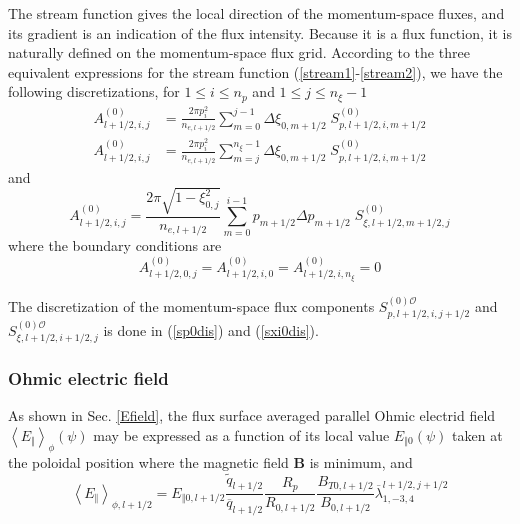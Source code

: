 \bigskip The stream function gives the local direction of the momentum-space
fluxes, and its gradient is an indication of the flux intensity. Because it is
a flux function, it is naturally defined on the momentum-space flux grid.
According to the three equivalent expressions for the stream function
(\ref{stream1}-\ref{stream2}), we have the following discretizations, for
$1\leq i\leq n_{p}$ and $1\leq j\leq n_{\xi}-1$
\begin{align}
A_{l+1/2,i,j}^{\left(  0\right)  }  &  =\frac{2\pi p_{i}^{2}}{n_{e,l+1/2}}%
\sum_{m=0}^{j-1}\Delta\xi_{0,m+1/2}\;S_{p,l+1/2,i,m+1/2}^{\left(  0\right)
}\label{streamdis}\\
A_{l+1/2,i,j}^{\left(  0\right)  }  &  =\frac{2\pi p_{i}^{2}}{n_{e,l+1/2}}%
\sum_{m=j}^{n_{\xi}-1}\Delta\xi_{0,m+1/2}\;S_{p,l+1/2,i,m+1/2}^{\left(
0\right)  }%
\end{align}
and
\begin{equation}
A_{l+1/2,i,j}^{\left(  0\right)  }=\frac{2\pi\sqrt{1-\xi_{0,j}^{2}}%
}{n_{e,l+1/2}}\sum_{m=0}^{i-1}p_{m+1/2}\Delta p_{m+1/2}\;S_{\xi,l+1/2,m+1/2,j}%
^{\left(  0\right)  } \label{streamdis2}%
\end{equation}
where the boundary conditions are%
\begin{equation}
A_{l+1/2,0,j}^{\left(  0\right)  }=A_{l+1/2,i,0}^{\left(  0\right)
}=A_{l+1/2,i,n_{\xi}}^{\left(  0\right)  }=0
\end{equation}

The discretization of the momentum-space flux components $S_{p,l+1/2,i,j+1/2}%
^{\left(  0\right)  \mathcal{O}}$ and $S_{\xi,l+1/2,i+1/2,j}^{\left(
0\right)  \mathcal{O}}$ is done in (\ref{sp0dis}) and (\ref{sxi0dis}).

\subsubsection{Ohmic electric field}

As shown in Sec. \ref{Efield}, the flux surface averaged parallel Ohmic
electrid field $\left\langle E_{\Vert}\right\rangle _{\phi}\left(
\psi\right)  $ may be expressed as a function of its local value $E_{\Vert
0}\left(  \psi\right)  $ taken at the poloidal position where the magnetic
field $\mathbf{B}$ is minimum, and
\begin{equation}
\left\langle E_{\Vert}\right\rangle _{\phi,l+1/2}=E_{\Vert0,l+1/2}%
\frac{\widetilde{q}_{l+1/2}}{\overline{q}_{l+1/2}}\frac{R_{p}}{R_{0,l+1/2}%
}\frac{B_{T0,l+1/2}}{B_{0,l+1/2}}\overline{\lambda}_{1,-3,4}^{l+1/2,j+1/2}%
\end{equation}

